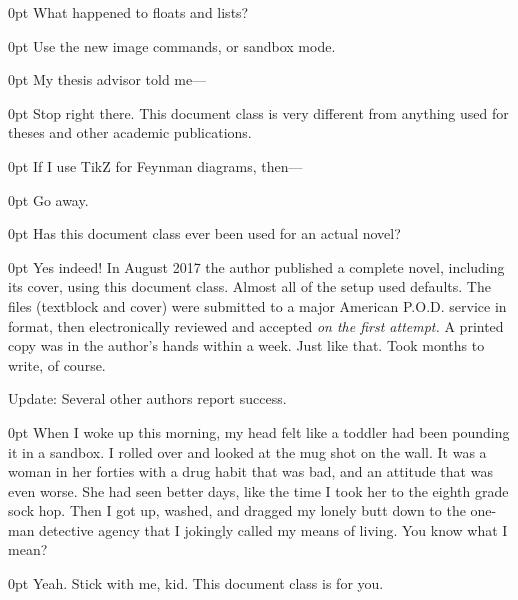 \documentclass{novel} %
\begin{document}
\begin{adjustwidth}{\parindent}{0pt}
\backindent{}What happened to floats and lists?
\end{adjustwidth}
\begin{adjustwidth}{\parindent}{0pt}
\backindent{}Use the new image commands, or sandbox mode.
\end{adjustwidth}

\begin{adjustwidth}{\parindent}{0pt}
\backindent{}My thesis advisor told me---
\end{adjustwidth}
\begin{adjustwidth}{\parindent}{0pt}
\backindent{}Stop right there. This document class is very different from anything used for theses and other academic publications.
\end{adjustwidth}

\begin{adjustwidth}{\parindent}{0pt}
\backindent{}If I use TikZ for Feynman diagrams, then---
\end{adjustwidth}
\begin{adjustwidth}{\parindent}{0pt}
\backindent{}Go away.
\end{adjustwidth}

\begin{adjustwidth}{\parindent}{0pt}
\backindent{}Has this document class ever been used for an actual novel?
\end{adjustwidth}
\begin{adjustwidth}{\parindent}{0pt}
\backindent{}Yes indeed! In August 2017 the author published a complete novel, including its cover, using this document class. Almost all of the setup used defaults. The files (textblock and cover) were submitted to a major American P.O.D. service in  format, then electronically reviewed and accepted \textit{on the first attempt.} A printed copy was in the author's hands within a week. Just like that. Took months to write, of course.\par
Update: Several other authors report success.
\end{adjustwidth}

\begin{adjustwidth}{\parindent}{0pt}
\backindent{}When I woke up this morning, my head felt like a toddler had been pounding it in a sandbox. I rolled over and looked at the mug shot on the wall. It was a woman in her forties with a drug habit that was bad, and an attitude that was even worse. She had seen better days, like the time I took her to the eighth grade sock hop. Then I got up, washed, and dragged my lonely butt down to the one-man detective agency that I jokingly called my means of living. You know what I mean?
\end{adjustwidth}
\begin{adjustwidth}{\parindent}{0pt}
\backindent{}Yeah. Stick with me, kid. This document class is for you.
\end{adjustwidth}
\end{document}
